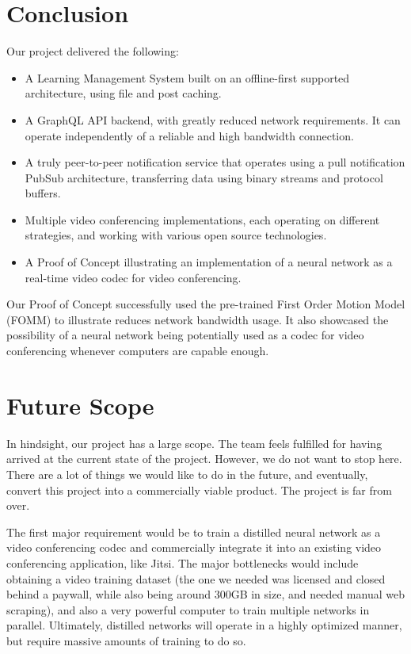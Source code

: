 \section{Conclusion}
Our project delivered the following:
\begin{itemize}
    \item A Learning Management System built on an offline-first supported architecture, using file and post caching.
    \item A GraphQL API backend, with greatly reduced network requirements. It can operate independently of a reliable and high bandwidth connection.
    \item A truly peer-to-peer notification service that operates using a pull notification PubSub architecture, 
    transferring data using binary streams and protocol buffers.
    \item Multiple video conferencing implementations, each operating on different strategies, 
    and working with various open source technologies.
    \item A Proof of Concept illustrating an implementation of a neural network as a real-time video codec for video conferencing.
\end{itemize}

Our Proof of Concept successfully used the pre-trained First Order Motion Model (FOMM) to illustrate reduces
network bandwidth usage. It also showcased the possibility of a neural network being potentially used as a codec for video conferencing whenever computers are capable enough.

\section{Future Scope}
In hindsight, our project has a large scope. The team feels fulfilled for having arrived at the current state of the project. 
However, we do not want to stop here. There are a lot of things we would like to do in the future, and eventually, convert this project into a commercially viable product. The project is far from over.

The first major requirement would be to train a distilled neural network as a video conferencing codec and commercially integrate it into an existing video conferencing application, like Jitsi. The major bottlenecks would include obtaining a video training dataset 
(the one we needed was licensed and closed behind a paywall, while also being around 300GB in size, and needed manual web scraping), and also a very powerful computer to train multiple networks in parallel. 
Ultimately, distilled networks will operate in a highly optimized manner, but require massive amounts of training to do so.

